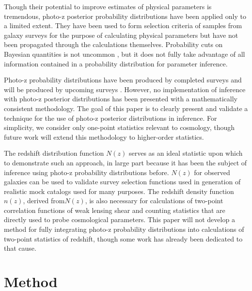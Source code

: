 \documentclass[preprint]{aastex}
\begin{document}
Though their potential to improve estimates of physical parameters is 
tremendous, photo-z posterior probability distributions have been applied only 
to a limited extent.  They have been used to form selection criteria of samples 
from galaxy surveys for the purpose of calculating physical parameters but have 
not been propagated through the calculations themselves.  
\citet{VanBreukelen2009,Viironen2015}  Probability cuts on Bayesian quantities 
is not uncommon \citep{Leung2015, DiPompeo2015a}, but it does not fully take 
advantage of all information contained in a probability distribution for 
parameter inference.  

Photo-z probability distributions have been produced by completed surveys 
\citep{Hildebrandt2012, Sheldon2012} and will be produced by upcoming surveys 
\citep{LSSTScienceCollaboration2009, CarrascoKind2014a, Masters2015a}.  
However, no implementation of inference with photo-z posterior distributions 
has been presented with a mathematically consistent methodology.  The goal of 
this paper is to clearly present and validate a technique for the use of 
photo-z posterior distributions in inference.  For simplicity, we consider only 
one-point statistics relevant to cosmology, though future work will extend this 
methodology to higher-order statistics.

The redshift distribution function $N(z)$ serves as an ideal statistic upon 
which to demonstrate such an approach, in large part because it has been the 
subject of inference using photo-z probability distributions before.  
\citep{Sheldon2012, Hildebrandt2012, Kelly2014, Benjamin2013, Bonnett2015a, 
Viironen2015, Asorey2016}  $N(z)$ for observed galaxies can be used to validate 
survey selection functions used in generation of realistic mock catalogs used 
for many purposes.  \citep{Norberg2002}  The redshift density function $n(z)$, 
derived from$N(z)$, is also necessary for calculations of two-point correlation 
functions of weak lensing shear and counting statistics that are directly used 
to probe cosmological parameters.  \citep{Masters2015}  This paper will not 
develop a method for fully integrating photo-z probability distributions into 
calculations of two-point statistics of redshift, though some work has already 
been dedicated to that cause.  \citep{Myers2009}

\clearpage
\section{Method}
\label{sec:meth}
\end{document}
